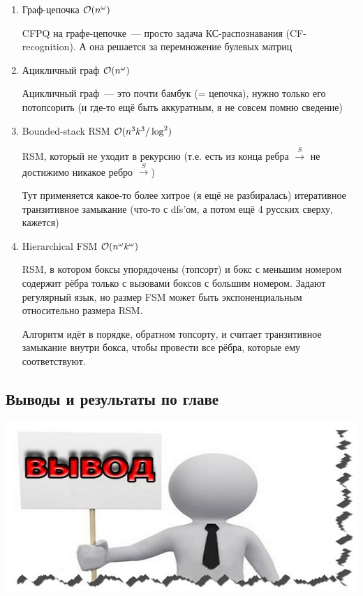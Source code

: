 \begin{enumerate}

    \item Граф-цепочка $\mathcal{O}(n^{\omega})$ \cite{Valiant1975}

        CFPQ на графе-цепочке~--- просто задача КС-распознавания (CF-recognition). А она решается за перемножение булевых матриц \cite{Valiant1975}

    \item Ацикличный граф $\mathcal{O}(n^{\omega})$ \cite{Yannakakis1990}

        Ацикличный граф~--- это почти бамбук (= цепочка), нужно только его потопсорить (и где-то ещё быть аккуратным, я не совсем помню сведение)

    \item Bounded-stack RSM $\mathcal{O}(n^3 k^3 / \log^2)$ \cite{Chaudhuri08}

        RSM, который не уходит в рекурсию (т.е. есть из конца ребра $\xrightarrow{S}$ не достижимо никакое ребро $\xrightarrow{S}$)

        Тут применяется какое-то более хитрое (я ещё не разбиралась) итеративное транзитивное замыкание (что-то с dfs'ом, а потом ещё 4 русских сверху, кажется)

    \item Hierarchical FSM $\mathcal{O}(n^{\omega} k^{\omega})$ \cite{Chaudhuri08}

        RSM, в котором боксы упорядочены (топсорт) и бокс с меньшим номером содержит рёбра только с вызовами боксов с большим номером. Задают регулярный язык, но размер FSM может быть экспоненциальным относительно размера RSM.

        Алгоритм идёт в порядке, обратном топсорту, и считает транзитивное замыкание внутри бокса, чтобы провести все рёбра, которые ему соответствуют.

\end{enumerate}

\subsection{Выводы и результаты по главе}

\TODO

\includegraphics[width=0.75\linewidth]{img/conclusion}
